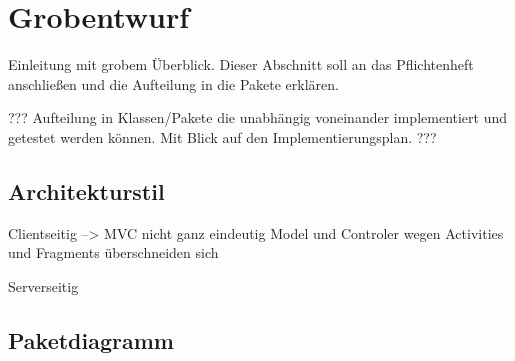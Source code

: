\section{Grobentwurf}
Einleitung mit grobem Überblick. Dieser Abschnitt soll an das Pflichtenheft anschließen und die Aufteilung in die Pakete erklären.

???
Aufteilung in Klassen/Pakete die unabhängig voneinander implementiert und getestet werden können. Mit Blick auf den Implementierungsplan.
???

\subsection{Architekturstil} 
Clientseitig
--> MVC nicht ganz eindeutig Model und Controler wegen Activities und Fragments überschneiden sich

Serverseitig

\subsection{Paketdiagramm}


